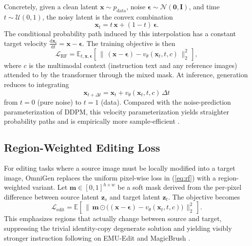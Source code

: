 \documentclass[conference]{IEEEtran}
\begin{document}
Concretely, given a clean latent $\mathbf{x}\sim p_{\text{data}}$, noise $\boldsymbol{\epsilon}\sim\mathcal{N}(\mathbf{0},\mathbf{I})$, and time $t\sim\mathcal{U}(0,1)$, the noisy latent is the convex combination
\begin{equation}
\mathbf{x}_t = t\,\mathbf{x} + (1-t)\,\boldsymbol{\epsilon}.
\end{equation}
The conditional probability path induced by this interpolation has a constant target velocity $\frac{\mathrm{d}\mathbf{x}_t}{\mathrm{d}t}=\mathbf{x}-\boldsymbol{\epsilon}$. The training objective is then
\begin{equation}
\mathcal{L}_{\mathrm{RF}}=\mathbb{E}_{t,\mathbf{x},\boldsymbol{\epsilon}}\left[\,\bigl\|\,(\mathbf{x}-\boldsymbol{\epsilon})-v_\theta(\mathbf{x}_t,t,c)\,\bigr\|_2^2\,\right],
\label{eq:rf}
\end{equation}
where $c$ is the multimodal context (instruction text and any reference images) attended to by the transformer through the mixed mask. At inference, generation reduces to integrating
\begin{equation}
\mathbf{x}_{t+\Delta t}=\mathbf{x}_t+v_\theta(\mathbf{x}_t,t,c)\,\Delta t
\end{equation}
from $t=0$ (pure noise) to $t=1$ (data). Compared with the noise-prediction parameterization of DDPM, this velocity parameterization yields straighter probability paths and is empirically more sample-efficient \cite{liu2022flow,sd3}.

\subsection{Region-Weighted Editing Loss}
For editing tasks where a source image must be locally modified into a target image, OmniGen \cite{omnigen2024} replaces the uniform pixel-wise loss in (\ref{eq:rf}) with a region-weighted variant. Let $\mathbf{m}\in[0,1]^{h\times w}$ be a soft mask derived from the per-pixel difference between source latent $\mathbf{z}_s$ and target latent $\mathbf{z}_t$. The objective becomes
\begin{equation}
\mathcal{L}_{\mathrm{edit}}=\mathbb{E}\!\left[\,\bigl\|\,\mathbf{m}\odot\bigl((\mathbf{x}-\boldsymbol{\epsilon})-v_\theta(\mathbf{x}_t,t,c)\bigr)\,\bigr\|_2^2\,\right].
\end{equation}
This emphasizes regions that actually change between source and target, suppressing the trivial identity-copy degenerate solution and yielding visibly stronger instruction following on EMU-Edit \cite{emuedit} and MagicBrush \cite{magicbrush}.
\end{document}
